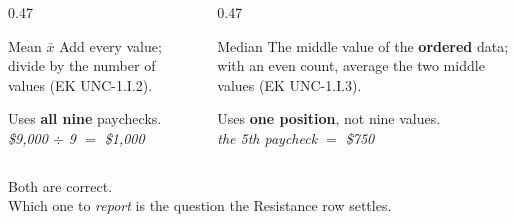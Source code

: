 \documentclass[aspectratio=169, 11pt]{beamer}
\begin{document}
\begin{frame}[t, plain]
  \vspace{4pt}
  \begin{columns}[t]
    \begin{column}{0.47\textwidth}
      \begin{block}{Mean $\bar x$}
        Add every value; divide by the number of values (EK UNC-1.I.2).
      \end{block}
      \vspace{4pt}
      {\small Uses \textbf{all nine} paychecks.\\[3pt]
      \emph{\$9{,}000 $\div$ 9 $=$ \$1{,}000}}
    \end{column}
    \begin{column}{0.47\textwidth}
      \begin{block}{Median}
        The middle value of the \textbf{ordered} data; with an even count, average the two
        middle values (EK UNC-1.I.3).
      \end{block}
      \vspace{4pt}
      {\small Uses \textbf{one position}, not nine values.\\[3pt]
      \emph{the 5th paycheck $=$ \$750}}
    \end{column}
  \end{columns}
  \vspace{12pt}
  \begin{center}
    {\large Both are correct. }\\[6pt]
    {\small\color{slate} Which one to \emph{report} is the question the Resistance row settles.}
  \end{center}
\end{frame}
\end{document}
